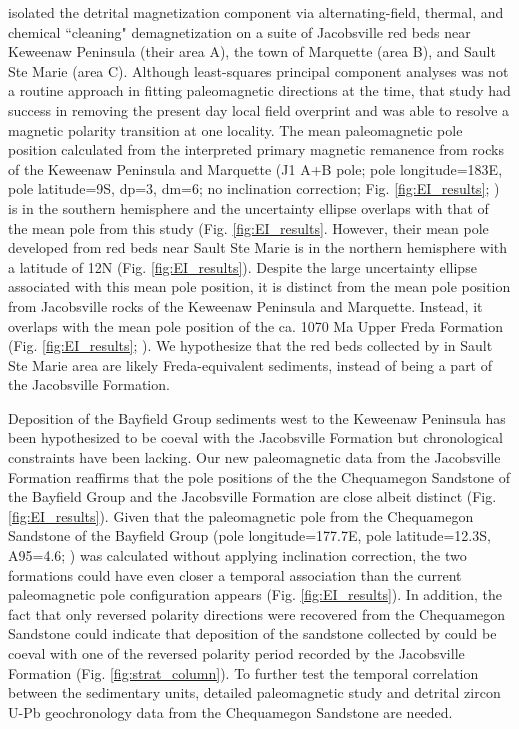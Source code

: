 \documentclass[draft]{agujournal2019}
\begin{document}
 isolated the detrital magnetization component via alternating-field, thermal, and chemical ``cleaning" demagnetization on a suite of Jacobsville red beds near Keweenaw Peninsula (their area A), the town of Marquette (area B), and Sault Ste Marie (area C). Although least-squares principal component analyses was not a routine approach in fitting paleomagnetic directions at the time, that study had success in removing the present day local field overprint and was able to resolve a magnetic polarity transition at one locality. The mean paleomagnetic pole position calculated from the interpreted primary magnetic remanence from rocks of the Keweenaw Peninsula and Marquette (J1 A+B pole; pole longitude=183\textdegree E, pole latitude=9\textdegree S, dp=3\textdegree, dm=6\textdegree; no inclination correction; Fig. \ref{fig:EI_results}; ) is in the southern hemisphere and the uncertainty ellipse overlaps with that of the mean pole from this study (Fig. \ref{fig:EI_results}. However, their mean pole developed from red beds near Sault Ste Marie is in the northern hemisphere with a latitude of 12\textdegree N (Fig. \ref{fig:EI_results}). Despite the large uncertainty ellipse associated with this mean pole position, it is distinct from the mean pole position from Jacobsville rocks of the Keweenaw Peninsula and Marquette. Instead, it overlaps with the mean pole position of the ca. 1070 Ma Upper Freda Formation (Fig. \ref{fig:EI_results}; ). We hypothesize that the red beds collected by  in Sault Ste Marie area are likely Freda-equivalent sediments, instead of being a part of the Jacobsville Formation. 

Deposition of the Bayfield Group sediments west to the Keweenaw Peninsula has been hypothesized to be coeval with the Jacobsville Formation but chronological constraints have been lacking. Our new paleomagnetic data from the Jacobsville Formation reaffirms that the pole positions of the the Chequamegon Sandstone of the Bayfield Group and the Jacobsville Formation are close albeit distinct (Fig. \ref{fig:EI_results}). Given that the paleomagnetic pole from the Chequamegon Sandstone of the Bayfield Group (pole longitude=177.7\textdegree E, pole latitude=12.3\textdegree S, A95=4.6\textdegree; ) was calculated without applying inclination correction, the two formations could have even closer a temporal association than the current paleomagnetic pole configuration appears (Fig. \ref{fig:EI_results}). In addition, the fact that only reversed polarity directions were recovered from the Chequamegon Sandstone could indicate that deposition of the sandstone collected by  could be coeval with one of the reversed polarity period recorded by the Jacobsville Formation (Fig. \ref{fig:strat_column}). To further test the temporal correlation between the sedimentary units, detailed paleomagnetic study and detrital zircon U-Pb geochronology data from the Chequamegon Sandstone are needed. 
\end{document}
